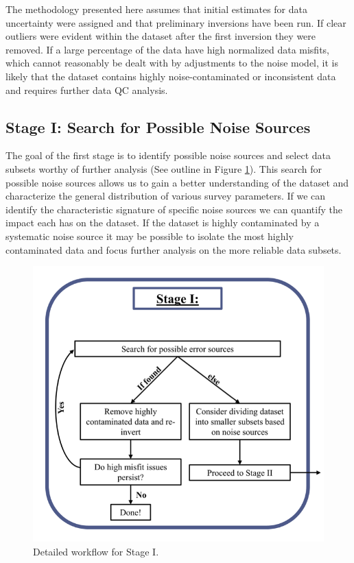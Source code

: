 \documentclass[final,authoryear,5p,times,twocolumn]{elsarticle}
\begin{document}
The methodology presented here assumes that initial estimates for data uncertainty were assigned and that preliminary inversions have been run. If clear outliers were evident within the dataset after the first inversion they were removed. If a large percentage of the data have high normalized data misfits, which cannot reasonably be dealt with by adjustments to the noise model, it is likely that the dataset contains highly noise-contaminated or inconsistent data and requires further data QC analysis.

\subsection{Stage I: Search for Possible Noise Sources}
\label{Data_Quality_Control:StageI}
The goal of the first stage is to identify possible noise sources and select data subsets worthy of further analysis (See outline in Figure \ref{fig:DataQC_workflow_StageI}). This search for possible noise sources allows us to gain a better understanding of the dataset and characterize the general distribution of various survey parameters. If we can identify the characteristic signature of specific noise sources we can quantify the impact each has on the dataset. If the dataset is highly contaminated by a systematic noise source it may be possible to isolate the most highly contaminated data and focus further analysis on the more reliable data subsets.

\begin{figure} [!ht]
\begin{center}
   \includegraphics[trim=0cm 0cm 0cm 0cm, clip=true,width=0.75\linewidth]{./Figures/Fig5.png}
\end{center}
\caption{Detailed workflow for Stage I.}
\label{fig:DataQC_workflow_StageI}
\end{figure}
\end{document}
